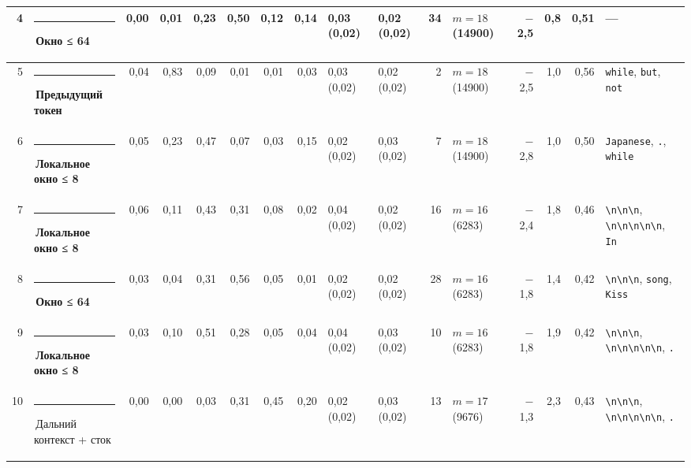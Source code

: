 \documentclass[10pt]{article}
\begin{document}
\begin{minipage}{\linewidth}
\begin{center}
{\begin{tabular}{|r|l|r|r|r|r|r|r|l|l|r|l|r|r|r|l|}
4 & \textcolor[HTML]{EDA100}{\rule{0.62em}{0.62em}}\,\textbf{Окно ≤ 64} & 0,00 & 0,01 & 0,23 & 0,50 & 0,12 & 0,14 & 0,03 (0,02) & 0,02 (0,02) & 34 & $m{=}18$ (14900) & $-$2,5 & 0,8 & 0,51 & — \\ \hline
5 & \textcolor[HTML]{2A78D6}{\rule{0.62em}{0.62em}}\,\textbf{Предыдущий токен} & 0,04 & 0,83 & 0,09 & 0,01 & 0,01 & 0,03 & 0,03 (0,02) & 0,02 (0,02) & 2 & $m{=}18$ (14900) & $-$2,5 & 1,0 & 0,56 & \texttt{\textvisiblespace{}while}, \texttt{\textvisiblespace{}but}, \texttt{\textvisiblespace{}not} \\ \hline
6 & \textcolor[HTML]{1BAF7A}{\rule{0.62em}{0.62em}}\,\textbf{Локальное окно ≤ 8} & 0,05 & 0,23 & 0,47 & 0,07 & 0,03 & 0,15 & 0,02 (0,02) & 0,03 (0,02) & 7 & $m{=}18$ (14900) & $-$2,8 & 1,0 & 0,50 & \texttt{\textvisiblespace{}Japanese}, \texttt{\textvisiblespace{}.}, \texttt{\textvisiblespace{}while} \\ \hline
7 & \textcolor[HTML]{1BAF7A}{\rule{0.62em}{0.62em}}\,\textbf{Локальное окно ≤ 8} & 0,06 & 0,11 & 0,43 & 0,31 & 0,08 & 0,02 & 0,04 (0,02) & 0,02 (0,02) & 16 & $m{=}16$ (6283) & $-$2,4 & 1,8 & 0,46 & \texttt{\textvisiblespace{}\textbackslash{}n\textbackslash{}n\textbackslash{}n}, \texttt{\textbackslash{}n\textbackslash{}n\textbackslash{}n\textbackslash{}n\textbackslash{}n}, \texttt{\textvisiblespace{}In} \\ \hline
8 & \textcolor[HTML]{EDA100}{\rule{0.62em}{0.62em}}\,\textbf{Окно ≤ 64} & 0,03 & 0,04 & 0,31 & 0,56 & 0,05 & 0,01 & 0,02 (0,02) & 0,02 (0,02) & 28 & $m{=}16$ (6283) & $-$1,8 & 1,4 & 0,42 & \texttt{\textvisiblespace{}\textbackslash{}n\textbackslash{}n\textbackslash{}n}, \texttt{\textvisiblespace{}song}, \texttt{\textvisiblespace{}Kiss} \\ \hline
9 & \textcolor[HTML]{1BAF7A}{\rule{0.62em}{0.62em}}\,\textbf{Локальное окно ≤ 8} & 0,03 & 0,10 & 0,51 & 0,28 & 0,05 & 0,04 & 0,04 (0,02) & 0,03 (0,02) & 10 & $m{=}16$ (6283) & $-$1,8 & 1,9 & 0,42 & \texttt{\textvisiblespace{}\textbackslash{}n\textbackslash{}n\textbackslash{}n}, \texttt{\textbackslash{}n\textbackslash{}n\textbackslash{}n\textbackslash{}n\textbackslash{}n}, \texttt{\textvisiblespace{}.} \\ \hline
10 & \textcolor[HTML]{C3C2B7}{\rule{0.62em}{0.62em}}\,Дальний контекст + сток & 0,00 & 0,00 & 0,03 & 0,31 & 0,45 & 0,20 & 0,02 (0,02) & 0,03 (0,02) & 13 & $m{=}17$ (9676) & $-$1,3 & 2,3 & 0,43 & \texttt{\textvisiblespace{}\textbackslash{}n\textbackslash{}n\textbackslash{}n}, \texttt{\textbackslash{}n\textbackslash{}n\textbackslash{}n\textbackslash{}n\textbackslash{}n}, \texttt{\textvisiblespace{}.} \\ \hline

\end{tabular}}
\end{center}
\end{minipage}
\end{document}
